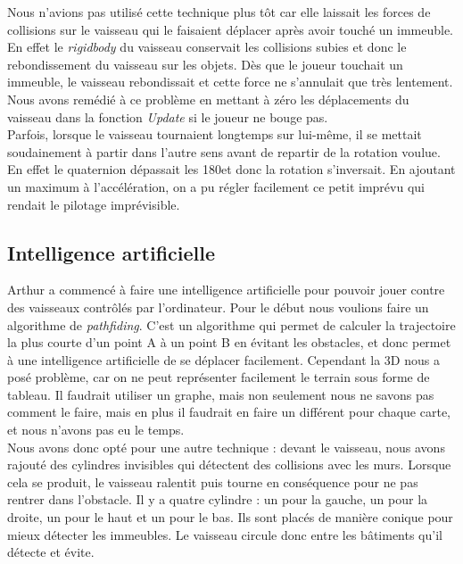 \documentclass[10pt, titlepage]{report}
\begin{document}
Nous n'avions pas utilisé cette technique plus tôt car elle laissait les forces de collisions sur le vaisseau qui le faisaient déplacer après avoir touché un immeuble. En effet le \textit{rigidbody} du vaisseau conservait les collisions subies et donc le rebondissement du vaisseau sur les objets. Dès que le joueur touchait un immeuble, le vaisseau rebondissait et cette force ne s'annulait que très lentement. Nous avons remédié à ce problème en mettant à zéro les déplacements du vaisseau dans la fonction \textit{Update} si le joueur ne bouge pas.\\

Parfois, lorsque le vaisseau tournaient longtemps sur lui-même, il se mettait soudainement à partir dans l'autre sens avant de repartir de la rotation voulue. En effet le quaternion dépassait les 180\textdegree  et donc la rotation s'inversait. En ajoutant un maximum à l'accélération, on a pu régler facilement ce petit imprévu qui rendait le pilotage imprévisible.\\

\subsection{Intelligence artificielle}

Arthur a commencé à faire une intelligence artificielle pour pouvoir jouer contre des vaisseaux contrôlés par l'ordinateur. Pour le début nous voulions faire un algorithme de \textit{pathfiding}. C'est un algorithme qui permet de calculer la trajectoire la plus courte d'un point A à un point B en évitant les obstacles, et donc permet à une intelligence artificielle de se déplacer facilement. Cependant la 3D nous a posé problème, car on ne peut représenter facilement le terrain sous forme de tableau. Il faudrait utiliser un graphe, mais non seulement nous ne savons pas comment le faire, mais en plus il faudrait en faire un différent pour chaque carte, et nous n'avons pas eu le temps.\\

Nous avons donc opté pour une autre technique : devant le vaisseau, nous avons rajouté des cylindres invisibles qui détectent des collisions avec les murs. Lorsque cela se produit, le vaisseau ralentit puis tourne en conséquence pour ne pas rentrer dans l'obstacle. Il y a quatre cylindre : un pour la gauche, un pour la droite, un pour le haut et un pour le bas. Ils sont placés de manière conique pour mieux détecter les immeubles. Le vaisseau circule donc entre les bâtiments qu'il détecte et évite.
\end{document}
